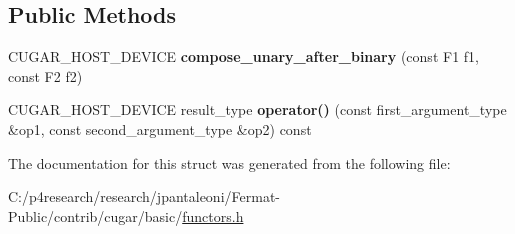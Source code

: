 \subsection*{Public Methods}
\begin{DoxyCompactItemize}
\item 
\mbox{\label{structcugar_1_1compose__unary__after__binary_a690775e543013946ea457a75a92e10d8}} 
C\+U\+G\+A\+R\+\_\+\+H\+O\+S\+T\+\_\+\+D\+E\+V\+I\+CE {\bfseries compose\+\_\+unary\+\_\+after\+\_\+binary} (const F1 f1, const F2 f2)
\item 
\mbox{\label{structcugar_1_1compose__unary__after__binary_aad4d07d1b68d633b0de01a22685764b4}} 
C\+U\+G\+A\+R\+\_\+\+H\+O\+S\+T\+\_\+\+D\+E\+V\+I\+CE result\+\_\+type {\bfseries operator()} (const first\+\_\+argument\+\_\+type \&op1, const second\+\_\+argument\+\_\+type \&op2) const
\end{DoxyCompactItemize}


The documentation for this struct was generated from the following file\+:\begin{DoxyCompactItemize}
\item 
C\+:/p4research/research/jpantaleoni/\+Fermat-\/\+Public/contrib/cugar/basic/\hyperlink{functors_8h}{functors.\+h}\end{DoxyCompactItemize}
